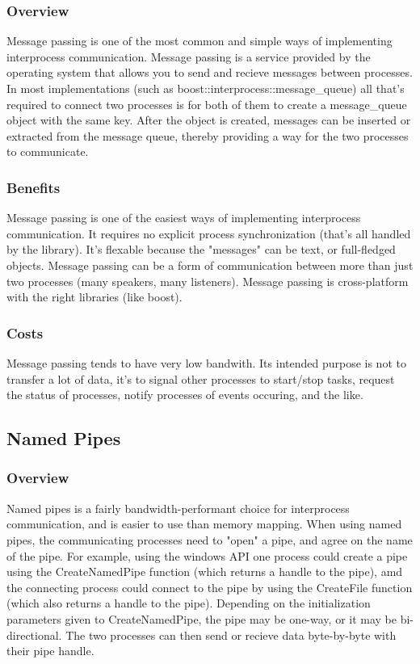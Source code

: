 \documentclass[se]{uw-wkrpt}
\begin{document}
\subsubsection{Overview}

Message passing is one of the most common and simple ways of implementing
interprocess communication. Message passing is a service provided by the operating
system that allows you to send and recieve messages between processes. In most
implementations (such as boost::interprocess::message\_queue) all that's required
to connect two processes is for both of them to create a message\_queue object with
the same key. After the object is created, messages can be inserted or extracted from
the message queue, thereby providing a way for the two processes to communicate.

\subsubsection{Benefits}

Message passing is one of the easiest ways of implementing interprocess communication.
It requires no explicit process synchronization (that's all handled by the library). It's
flexable because the "messages" can be text, or full-fledged objects. Message passing
can be a form of communication between more than just two processes (many speakers, many listeners). Message passing is
cross-platform with the right libraries (like boost).

\subsubsection{Costs}

Message passing tends to have very low bandwith. Its intended purpose is not to transfer
a lot of data, it's to signal other processes to start/stop tasks, request the status
of processes, notify processes of events occuring, and the like.

\subsection{Named Pipes}

\subsubsection{Overview}

Named pipes is a fairly bandwidth-performant choice for interprocess communication, and
is easier to use than memory mapping. When using named pipes, the communicating processes 
need to "open" a pipe, and agree on the name of the pipe. For example, using the windows API
one process could create a pipe using the CreateNamedPipe function (which returns a handle to the pipe),
amd the connecting process could connect to the pipe by using the CreateFile function (which also returns a handle to the
pipe). Depending on the initialization parameters given to CreateNamedPipe, the pipe may
be one-way, or it may be bi-directional. The two processes can then send or recieve data byte-by-byte
with their pipe handle.
\end{document}
